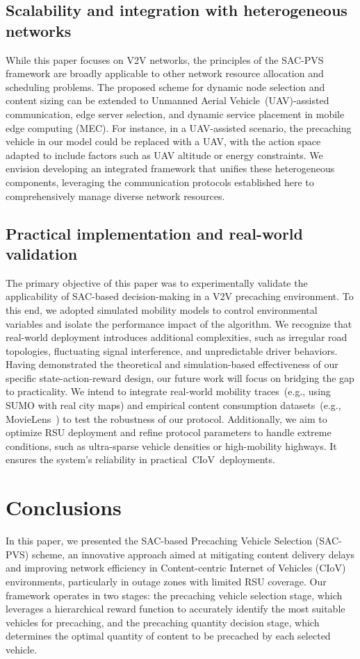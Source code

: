 \documentclass{aims}
\numberwithin{equation}{section}
\begin{document}
\subsection{Scalability and integration with heterogeneous networks}
While this paper focuses on V2V networks, the principles of the SAC-PVS framework are broadly applicable to other network resource allocation and scheduling problems.
The proposed scheme for dynamic node selection and content sizing can be extended to Unmanned Aerial Vehicle~(UAV)-assisted communication, edge server selection, and dynamic service placement in mobile edge computing (MEC).
For instance, in a UAV-assisted scenario\cite{Liu2024}, the precaching vehicle in our model could be replaced with a UAV, with the action space adapted to include factors such as UAV altitude or energy constraints.
We envision developing an integrated framework that unifies these heterogeneous components, leveraging the communication protocols established here to comprehensively manage diverse network resources.

\subsection{Practical implementation and real-world validation}
The primary objective of this paper was to experimentally validate the applicability of SAC-based decision-making in a V2V precaching environment.
To this end, we adopted simulated mobility models to control environmental variables and isolate the performance impact of the algorithm.
We recognize that real-world deployment introduces additional complexities, such as irregular road topologies, fluctuating signal interference, and unpredictable driver behaviors.
Having demonstrated the theoretical and simulation-based effectiveness of our specific state-action-reward design, our future work will focus on bridging the gap to practicality.
We intend to integrate real-world mobility traces~(e.g., using SUMO \cite{SUMO}  with real city maps) and empirical content consumption datasets~(e.g., MovieLens~\cite{MovieLens}) to test the robustness of our protocol.
Additionally, we aim to optimize RSU deployment and refine protocol parameters to handle extreme conditions, such as ultra-sparse vehicle densities or high-mobility highways.
It ensures the system's reliability in practical~CIoV~deployments.

\section{Conclusions} \label{sec.conc}
In this paper, we presented the SAC-based Precaching Vehicle Selection (SAC-PVS) scheme, an innovative approach aimed at mitigating content delivery delays and improving network efficiency in Content-centric Internet of Vehicles (CIoV) environments, particularly in outage zones with limited RSU coverage.
Our framework operates in two stages: the precaching vehicle selection stage, which leverages a hierarchical reward function to accurately identify the most suitable vehicles for precaching, and the precaching quantity decision stage, which determines the optimal quantity of content to be precached by each selected vehicle.
\end{document}
